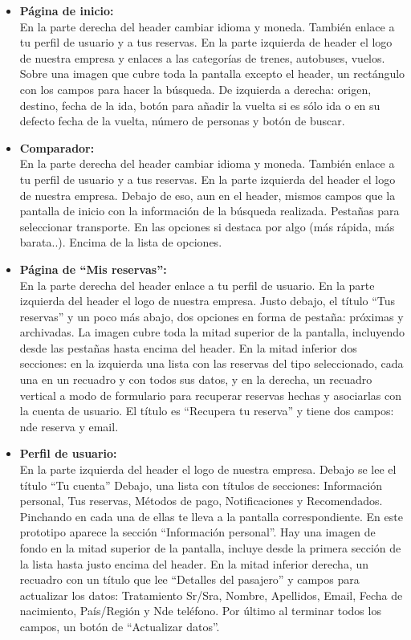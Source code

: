 \begin{itemize}
      \item\textbf{Página de inicio:} \\ En la parte derecha del header cambiar idioma y moneda. También enlace a tu perfil de usuario y a tus reservas.
            En la parte izquierda de header el logo de nuestra empresa y enlaces a las categorías de trenes, autobuses, vuelos.
            Sobre una imagen que cubre toda la pantalla excepto el header, un rectángulo con los campos para hacer la búsqueda. De izquierda a derecha: origen, destino, fecha de la ida, botón para añadir la vuelta si es sólo ida o en su defecto fecha de la vuelta, número de personas y botón de buscar.

      \item\textbf{Comparador:} \\ En la parte derecha del header cambiar idioma y moneda. También enlace a tu perfil de usuario y a tus reservas.
            En la parte izquierda del header el logo de nuestra empresa.
            Debajo de eso, aun en el header, mismos campos que la pantalla de inicio con la información de la búsqueda realizada.
            Pestañas para seleccionar transporte.
            En las opciones si destaca por algo (más rápida, más barata..).
            Encima de la lista de opciones.

      \item\textbf{Página de ``Mis reservas'':} \\ En la parte derecha del header enlace a tu perfil de usuario. En la parte izquierda del header el logo de nuestra empresa.
            Justo debajo, el título “Tus reservas” y un poco más abajo, dos opciones en forma de pestaña: próximas y archivadas.
            La imagen cubre toda la mitad superior de la pantalla, incluyendo desde las pestañas hasta encima del header.
            En la mitad inferior dos secciones: en la izquierda una lista con las reservas del tipo seleccionado, cada una en un recuadro y con todos sus datos, y en la derecha, un recuadro vertical a modo de formulario para recuperar reservas hechas y asociarlas con la cuenta de usuario. El título es “Recupera tu reserva” y tiene dos campos: n\textdegree de reserva y email.

      \item\textbf{Perfil de usuario:} \\ En la parte izquierda del header el logo de nuestra empresa.
            Debajo se lee el título “Tu cuenta”
            Debajo, una lista con títulos de secciones: Información personal, Tus reservas, Métodos de pago, Notificaciones y Recomendados. Pinchando en cada una de ellas te lleva a la pantalla correspondiente. En este prototipo aparece la sección “Información personal”.
            Hay una imagen de fondo en la mitad superior de la pantalla, incluye desde la primera sección de la lista hasta justo encima del header.
            En la mitad inferior derecha, un recuadro con un título que lee “Detalles del pasajero” y campos para actualizar los datos: Tratamiento Sr/Sra, Nombre, Apellidos, Email, Fecha de nacimiento, País/Región y N\textdegree de teléfono. Por último al terminar todos los campos, un botón de “Actualizar datos”.


\end{itemize}
